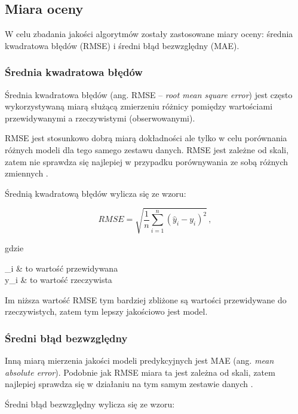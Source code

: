 \documentclass[twoside]{iisthesis}
\begin{document}
		\subsection{Miara oceny}
	
		W celu zbadania jakości algorytmów zostały zastosowane miary oceny: średnia kwadratowa błędów (RMSE) i średni błąd bezwzględny (MAE).
		
		\subsubsection{Średnia kwadratowa błędów}
	
		Średnia kwadratowa błędów (ang. RMSE -- \textit{root mean square error}) jest często wykorzystywaną miarą służącą zmierzeniu różnicy pomiędzy wartościami przewidywanymi a rzeczywistymi (obserwowanymi). 
		
		RMSE jest stosunkowo dobrą miarą dokładności ale tylko w celu porównania  różnych modeli dla tego samego zestawu danych. RMSE jest zależne od skali, zatem nie sprawdza się najlepiej w przypadku porównywania ze sobą różnych zmiennych \cite{hyndman2006another}.
		
		Średnią kwadratową błędów wylicza się ze wzoru:
		
		\begin{equation}
			\label{eq:rmse}
			RMSE = \sqrt{ \frac{1}{n} \sum_{i=1}^{n} (\hat{y}_i - y_i)^2 }
			\,,
		\end{equation}
	
		gdzie
		
		\begin{conditions*}
			_i & to wartość przewidywana \\
			y_i  &  to wartość rzeczywista
		\end{conditions*} 
		
		Im niższa wartość RMSE tym bardziej zbliżone są wartości przewidywane do rzeczywistych, zatem tym lepszy jakościowo jest model. 
		
		\subsubsection{Średni błąd bezwzględny}
		
		Inną miarą mierzenia jakości modeli predykcyjnych jest MAE (ang. \textit{mean absolute error}). Podobnie jak RMSE miara ta jest zależna od skali, zatem najlepiej sprawdza się w działaniu na tym samym zestawie danych \cite{hyndman2006another}. 
		
		Średni błąd bezwzględny wylicza się ze wzoru:
		
\end{document}
